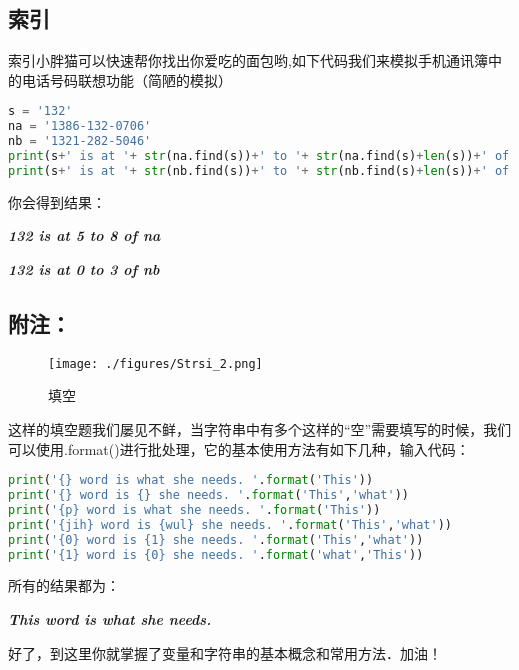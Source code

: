 \subsection{索引}
索引小胖猫可以快速帮你找出你爱吃的面包哟,如下代码我们来模拟手机通讯簿中的电话号码联想功能（简陋的模拟）

\begin{lstlisting}[language=python]
s = '132'
na = '1386-132-0706'
nb = '1321-282-5046'
print(s+' is at '+ str(na.find(s))+' to '+ str(na.find(s)+len(s))+' of na')
print(s+' is at '+ str(nb.find(s))+' to '+ str(nb.find(s)+len(s))+' of nb')
\end{lstlisting}
你会得到结果：

\textsl{\textbf{132 is at 5 to 8 of na}}

\textsl{\textbf{132 is at 0 to 3 of nb}}
\subsection{附注：}
\begin{figure}[ht]
\centering
\texttt{[image: ./figures/Strsi\_2.png]}
\caption{填空} \label{Strsi_fig2}
\end{figure}
这样的填空题我们屡见不鲜，当字符串中有多个这样的“空”需要填写的时候，我们可以使用.format()进行批处理，它的基本使用方法有如下几种，输入代码：
\begin{lstlisting}[language=python]
print('{} word is what she needs. '.format('This'))
print('{} word is {} she needs. '.format('This','what'))
print('{p} word is what she needs. '.format('This'))
print('{jih} word is {wul} she needs. '.format('This','what'))
print('{0} word is {1} she needs. '.format('This','what'))
print('{1} word is {0} she needs. '.format('what','This'))
\end{lstlisting}
所有的结果都为：

\textsl{\textbf{This word is what she needs.}}

好了，到这里你就掌握了变量和字符串的基本概念和常用方法．加油！
